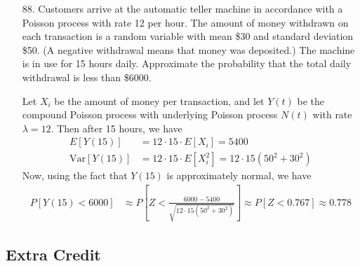 \documentclass{article}
\newcommand{\var}{\mathrm{Var}}
\begin{document}
\begin{itemize}
	\item[88.] Customers arrive at the automatic teller machine in accordance with a Poisson process with rate 12 per hour. The amount of money withdrawn on each transaction is a random variable with mean \$30 and standard deviation \$50. (A negative withdrawal means that money was deposited.) The machine is in use for 15 hours daily. Approximate the probability that the total daily withdrawal is less than \$6000.
		\begin{soln}
			Let $X_i$ be the amount of money per transaction, and let $Y(t)$ be the compound Poisson process with underlying Poisson process $N(t)$ with rate $\lambda=12.$ Then after 15 hours, we have
			\begin{align*}
				E[Y(15)] &= 12\cdot 15 \cdot E[X_i] = 5400 \\
				\var\left[ Y(15) \right] &= 12\cdot 15\cdot E[X_i^2] = 12\cdot 15(50^2+30^2)
			\end{align*}
			Now, using the fact that $Y(15)$ is approximately normal, we have
			\begin{align*}
				P\left[ Y(15)<6000 \right] &\approx P\left[ Z < \frac{6000-5400}{\sqrt{12\cdot 15(50^2+30^2)}} \right] \approx P\left[ Z<0.767 \right] \approx \boxed{0.778}
			\end{align*}
		\end{soln}

\end{itemize}

\subsection*{Extra Credit}
\end{document}
